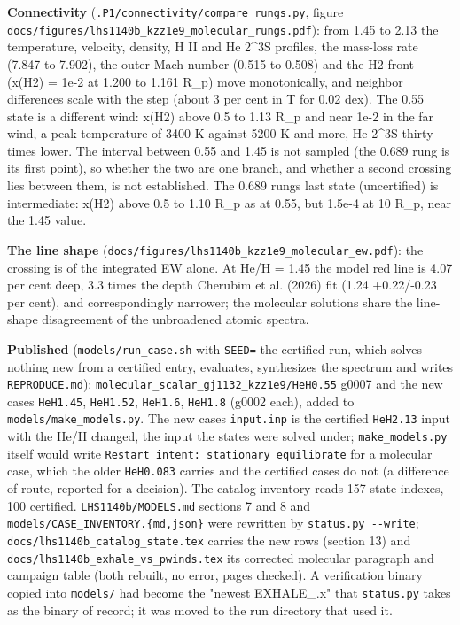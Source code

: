 \documentclass[english,a4paper]{my_memo}
\begin{document}
\textbf{Connectivity} (\texttt{.P1/connectivity/compare\_rungs.py}, figure
\texttt{docs/figures/lhs1140b\_kzz1e9\_molecular\_rungs.pdf}): from 1.45 to 2.13 the
temperature, velocity, density, H II and He 2\^{}3S profiles, the mass-loss rate
(7.847 to 7.902), the outer Mach number (0.515 to 0.508) and the H2 front
(x(H2) = 1e-2 at 1.200 to 1.161 R\_p) move monotonically, and neighbor
differences scale with the step (about 3 per cent in T for 0.02 dex). The
0.55 state is a different wind: x(H2) above 0.5 to 1.13 R\_p and near 1e-2 in
the far wind, a peak temperature of 3400 K against 5200 K and more, He 2\^{}3S
thirty times lower. The interval between 0.55 and 1.45 is not sampled
(the 0.689 rung is its first point), so whether the two are one branch, and
whether a second crossing lies between them, is not established. The
0.689 rung\textquotesingle s last state (uncertified) is intermediate: x(H2) above 0.5 to
1.10 R\_p as at 0.55, but 1.5e-4 at 10 R\_p, near the 1.45 value.

\textbf{The line shape} (\texttt{docs/figures/lhs1140b\_kzz1e9\_molecular\_ew.pdf}): the
crossing is of the integrated EW alone. At He/H = 1.45 the model red line is
4.07 per cent deep, 3.3 times the depth Cherubim et al. (2026) fit
(1.24 +0.22/-0.23 per cent), and correspondingly narrower; the molecular
solutions share the line-shape disagreement of the unbroadened atomic
spectra.

\textbf{Published} (\texttt{models/run\_case.sh} with \texttt{SEED=} the certified run, which
solves nothing new from a certified entry, evaluates, synthesizes the spectrum
and writes \texttt{REPRODUCE.md}): \texttt{molecular\_scalar\_gj1132\_kzz1e9/HeH0.55} g0007 and
the new cases \texttt{HeH1.45}, \texttt{HeH1.52}, \texttt{HeH1.6}, \texttt{HeH1.8} (g0002 each), added to
\texttt{models/make\_models.py}. The new cases\textquotesingle{} \texttt{input.inp} is the certified
\texttt{HeH2.13} input with the He/H changed, the input the states were solved under;
\texttt{make\_models.py} itself would write \texttt{Restart\ intent:\ stationary\ equilibrate}
for a molecular case, which the older \texttt{HeH0.083} carries and the certified
cases do not (a difference of route, reported for a decision). The catalog
inventory reads 157 state indexes, 100 certified. \texttt{LHS1140b/MODELS.md}
sections 7 and 8 and \texttt{models/CASE\_INVENTORY.\{md,json\}} were rewritten by
\texttt{status.py\ -\/-write}; \texttt{docs/lhs1140b\_catalog\_state.tex} carries the new rows
(section 13) and \texttt{docs/lhs1140b\_exhale\_vs\_pwinds.tex} its corrected
molecular paragraph and campaign table (both rebuilt, no error, pages checked).
A verification binary copied into \texttt{models/} had become the "newest
EXHALE\_.x" that \texttt{status.py} takes as the binary of record; it was moved to
the run directory that used it.
\end{document}
